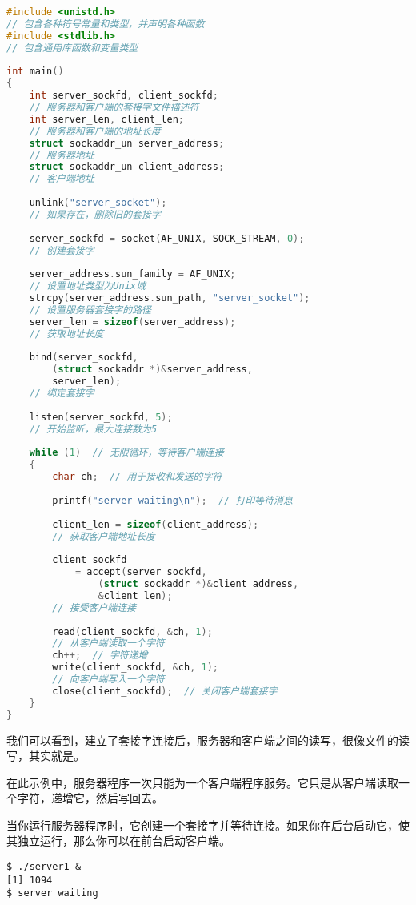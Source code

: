 \documentclass{ctexart}
\begin{document}
\begin{lstlisting}[language=C]  
#include <unistd.h>      
// 包含各种符号常量和类型，并声明各种函数  
#include <stdlib.h>      
// 包含通用库函数和变量类型  
      
int main()  
{  
    int server_sockfd, client_sockfd;  
    // 服务器和客户端的套接字文件描述符  
    int server_len, client_len;  
    // 服务器和客户端的地址长度  
    struct sockaddr_un server_address;  
    // 服务器地址  
    struct sockaddr_un client_address;  
    // 客户端地址  
      
    unlink("server_socket");  
    // 如果存在，删除旧的套接字  
      
    server_sockfd = socket(AF_UNIX, SOCK_STREAM, 0);  
    // 创建套接字  
      
    server_address.sun_family = AF_UNIX;  
    // 设置地址类型为Unix域  
    strcpy(server_address.sun_path, "server_socket");  
    // 设置服务器套接字的路径  
    server_len = sizeof(server_address);  
    // 获取地址长度  
      
    bind(server_sockfd, 
        (struct sockaddr *)&server_address, 
        server_len);  
    // 绑定套接字  
      
    listen(server_sockfd, 5);  
    // 开始监听，最大连接数为5  
      
    while (1)  // 无限循环，等待客户端连接  
    {  
        char ch;  // 用于接收和发送的字符  
      
        printf("server waiting\n");  // 打印等待消息  
      
        client_len = sizeof(client_address);  
        // 获取客户端地址长度  
      
        client_sockfd 
            = accept(server_sockfd,  
                (struct sockaddr *)&client_address, 
                &client_len);  
        // 接受客户端连接  
      
        read(client_sockfd, &ch, 1);  
        // 从客户端读取一个字符  
        ch++;  // 字符递增  
        write(client_sockfd, &ch, 1);  
        // 向客户端写入一个字符  
        close(client_sockfd);  // 关闭客户端套接字  
    }  
}  
\end{lstlisting}  

我们可以看到，建立了套接字连接后，服务器和客户端之间的读写，很像文件的读写，其实就是。

在此示例中，服务器程序一次只能为一个客户端程序服务。它只是从客户端读取一个字符，递增它，然后写回去。
   
当你运行服务器程序时，它创建一个套接字并等待连接。如果你在后台启动它，使其独立运行，那么你可以在前台启动客户端。  
\begin{verbatim}  
$ ./server1 &  
[1] 1094  
$ server waiting
\end{verbatim}  
\end{document}
